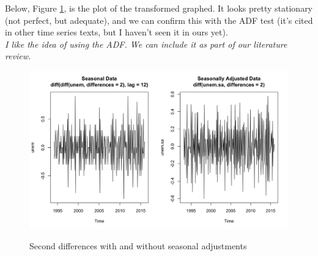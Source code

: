       Below, Figure \ref{fig:secdiff},  is the plot of the transformed graphed. It looks pretty stationary (not perfect, but adequate), and we can confirm this with the ADF test (it's cited in other time series texts, but I haven't seen it in ours yet).\\
      
      \textit{I like the idea of using the ADF. We can include it as part of our literature review.}
      
      
      \begin{figure}[H]
      	\centering
      	\caption{Second differences with and without seasonal adjustments}
      	\includegraphics[width=.7\linewidth]{images/stationarity}
      	\label{fig:secdiff}
      \end{figure}
      

    

  
  

  

